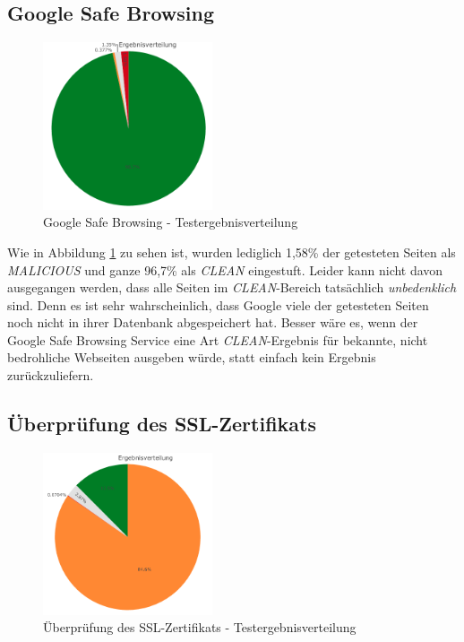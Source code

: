 \subsection{Google Safe Browsing}
\begin{figure}[H]
  \centering
  \includegraphics[width=5cm]{images/stats/diagoogle}
  \caption{Google Safe Browsing - Testergebnisverteilung}
  \label{fig:analyse-diagoogle}
\end{figure}

Wie in Abbildung \ref{fig:analyse-diagoogle} zu sehen ist, wurden lediglich 1,58\% der
getesteten Seiten als \textit{MALICIOUS} und ganze 96,7\% als \textit{CLEAN} eingestuft.
Leider kann nicht davon ausgegangen werden, dass alle Seiten im \textit{CLEAN}-Bereich tatsächlich \textit{unbedenklich} sind.
Denn es ist sehr wahrscheinlich, dass Google viele der getesteten Seiten noch nicht in ihrer Datenbank abgespeichert hat.
Besser wäre es, wenn der Google Safe Browsing Service eine Art \textit{CLEAN}-Ergebnis für bekannte, nicht bedrohliche Webseiten ausgeben würde, statt einfach kein Ergebnis zurückzuliefern.

\subsection{Überprüfung des SSL-Zertifikats}
\begin{figure}[H]
  \centering
  \includegraphics[width=5cm]{images/stats/diacertificate}
  \caption{Überprüfung des SSL-Zertifikats - Testergebnisverteilung}
  \label{fig:analyse-diacertificate}
\end{figure}

